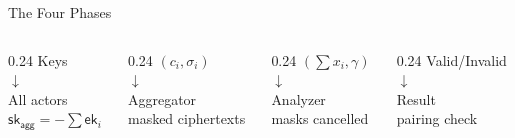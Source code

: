 \documentclass[aspectratio=169,10pt]{beamer}
\begin{document}
\begin{frame}[fragile]{The Four Phases}
    \begin{columns}[T]
        \begin{column}{0.24\textwidth}
            \centering
            \textcolor{secondary}{Keys}\\
            $\downarrow$\\
            {\small All actors}\\[0.5em]
            {\tiny $\mathsf{sk}_{\mathsf{agg}} = -\sum \mathsf{ek}_i$}
        \end{column}
        \begin{column}{0.24\textwidth}
            \centering
            \textcolor{primary}{$(c_i, \sigma_i)$}\\
            $\downarrow$\\
            {\small Aggregator}\\[0.5em]
            {\tiny masked ciphertexts}
        \end{column}
        \begin{column}{0.24\textwidth}
            \centering
            \textcolor{warning}{$(\sum x_i, \gamma)$}\\
            $\downarrow$\\
            {\small Analyzer}\\[0.5em]
            {\tiny masks cancelled}
        \end{column}
        \begin{column}{0.24\textwidth}
            \centering
            \textcolor{success}{Valid/Invalid}\\
            $\downarrow$\\
            {\small Result}\\[0.5em]
            {\tiny pairing check}
        \end{column}
    \end{columns}
\end{frame}
\end{document}
